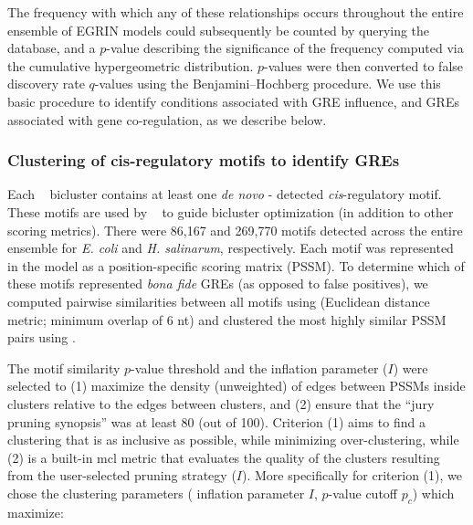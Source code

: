 \noindent The frequency with which any of these relationships occurs throughout the
 entire ensemble of EGRIN models could subsequently be counted by
 querying the database, and a $p$-value describing the significance of
 the frequency computed via the cumulative hypergeometric
 distribution. $p$-values were then converted to false discovery rate
 $q$-values using the Benjamini–Hochberg procedure.  We use this
basic procedure to identify conditions associated with GRE influence,
and GREs associated with gene co-regulation, as we describe below.


\subsubsection{Clustering of cis-regulatory motifs to identify GREs}
\label{section:gres}

Each \cm~ bicluster contains at least one {\it de novo} \MEME -
detected \cite{Bailey1998} {\it cis}-regulatory motif. These motifs
are used by \cm~ to guide bicluster optimization (in addition to other
scoring metrics). There were 86,167 and 269,770 motifs detected across
the entire ensemble for {\it E. coli} and {\it H. salinarum},
respectively. Each motif was represented in the model as a
position-specific scoring matrix (PSSM). To determine which of these
motifs represented \textit{bona fide} GREs (as opposed to false positives), we
computed pairwise similarities between all motifs using  
\cite{Gupta2007} (Euclidean distance metric; minimum overlap of 6 nt) 
and clustered the most highly similar PSSM pairs
using  \cite{vanDongen2012}. 

The  motif
similarity $p$-value threshold and the  inflation
parameter ($I$) were selected to (1) maximize the density (unweighted)
of edges between PSSMs inside clusters relative to the edges between
clusters, and (2) ensure that the  ``jury pruning
synopsis'' was at least 80 (out of 100). Criterion (1) aims to
find a clustering that is as inclusive as possible, while minimizing
over-clustering, while (2) is a built-in mcl metric that evaluates the
quality of the clusters resulting from the user-selected pruning
strategy ($I$). More specifically for criterion (1), we chose the
clustering parameters ( inflation parameter
$I$,  $p$-value cutoff $p_c$) which maximize:

